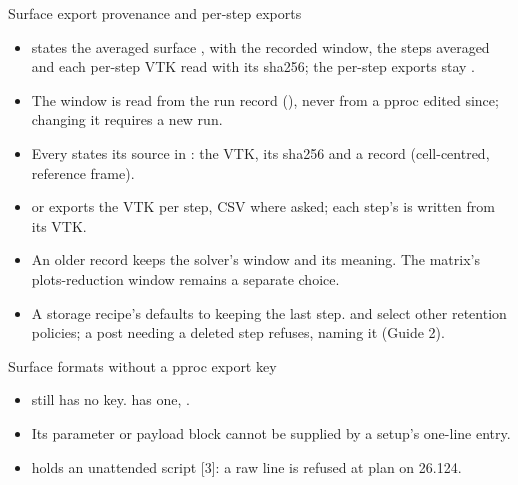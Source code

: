 \begin{frame}{Surface export provenance and per-step exports}
\begin{itemize}\small
  \item {} states the averaged surface ,
        with the recorded window, the steps averaged and each per-step VTK read
        with its sha256; the per-step exports stay .
  \item The window is read from the run record (),
        never from a pproc edited since; changing it requires a new run.
  \item Every  states its source in : the VTK,
        its sha256 and a  record (cell-centred, reference frame).
  \item {} or 
        exports the VTK per step, CSV where asked; each step's  is
        written from its VTK.
  \item An older record keeps the solver's window and its
        meaning. The matrix's plots-reduction window remains a separate choice.
  \item A storage recipe's  defaults to keeping
        the last step.  and  select other
        retention policies; a post needing a deleted step refuses, naming it
        (Guide 2).
\end{itemize}
\end{frame}

\begin{frame}{Surface formats without a pproc export key}
\begin{itemize}\small
  \item {} still has no
        \code{[exports]} key. 
        has one, .
  \item Its parameter or payload block cannot be supplied by a setup's
        one-line \code{[[raw]]} entry.
  \item {} holds an unattended script
        [3]: a raw line is refused at plan on 26.124.
\end{itemize}
\end{frame}
